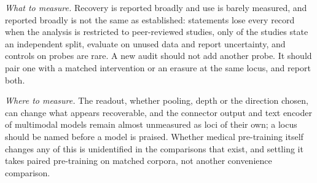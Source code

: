 \emph{What to measure.} Recovery is reported broadly and use is barely measured, and reported broadly is
not the same as established: \Fsensrefemptyn{} statements lose every record when the analysis is
restricted to peer-reviewed studies, only \Nminvalid{} of the \Ncore{} studies state an independent
split, evaluate on unused data and report uncertainty, and controls on probes are rare. A new audit
should not add another probe. It should pair one with a matched intervention or an erasure at the same
locus, and report both.

\emph{Where to measure.} The readout, whether pooling, depth or the direction chosen, can change what
appears recoverable, and the connector output and text encoder of multimodal models remain almost
unmeasured as loci of their own; a locus should be named before a model is praised. Whether medical
pre-training itself changes any of this is unidentified in the comparisons that exist, and settling it
takes paired pre-training on matched corpora, not another convenience comparison.
